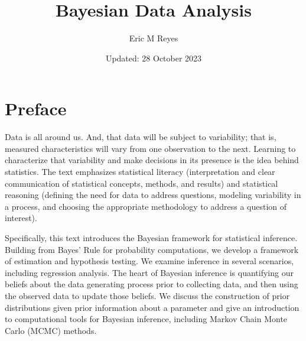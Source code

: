 \documentclass[
  letterpaper,
  DIV=11,
  numbers=noendperiod]{scrreprt}
\title{Bayesian Data Analysis}
\author{Eric M Reyes}
\date{Updated: 28 October 2023}
\renewcommand*\contentsname{Table of contents}
\newcommand\contentsname{Table of contents}
\theoremstyle{definition}
\theoremstyle{plain}
\theoremstyle{definition}
\theoremstyle{remark}
\begin{document}
\maketitle
\ifdefined\Shaded\renewenvironment{Shaded}{\begin{tcolorbox}[interior hidden, frame hidden, borderline west={3pt}{0pt}{shadecolor}, breakable, enhanced, sharp corners, boxrule=0pt]}{\end{tcolorbox}}\fi

\renewcommand*\contentsname{Table of contents}
{
\hypersetup{linkcolor=}
\setcounter{tocdepth}{2}
\tableofcontents
}

\hypertarget{preface}{%
\chapter*{Preface}\label{preface}}


\providecommand{\norm}[1]{\lVert#1\rVert}
\providecommand{\abs}[1]{\lvert#1\rvert}
\providecommand{\iid}{\stackrel{\text{IID}}{\sim}}
\providecommand{\ind}{\stackrel{\text{Ind}}{\sim}}

\providecommand{\bm}[1]{\mathbf{#1}}
\providecommand{\bs}[1]{\boldsymbol{#1}}
\providecommand{\bbeta}{\bs{\beta}}

\providecommand{\Ell}{\mathcal{L}}
\providecommand{\indep}{\perp\negthickspace\negmedspace\perp}

Data is all around us. And, that data will be subject to variability;
that is, measured characteristics will vary from one observation to the
next. Learning to characterize that variability and make decisions in
its presence is the idea behind statistics. The text emphasizes
statistical literacy (interpretation and clear communication of
statistical concepts, methods, and results) and statistical reasoning
(defining the need for data to address questions, modeling variability
in a process, and choosing the appropriate methodology to address a
question of interest).

Specifically, this text introduces the Bayesian framework for
statistical inference. Building from Bayes' Rule for probability
computations, we develop a framework of estimation and hypothesis
testing. We examine inference in several scenarios, including regression
analysis. The heart of Bayesian inference is quantifying our beliefs
about the data generating process prior to collecting data, and then
using the observed data to update those beliefs. We discuss the
construction of prior distributions given prior information about a
parameter and give an introduction to computational tools for Bayesian
inference, including Markov Chain Monte Carlo (MCMC) methods.
\end{document}
